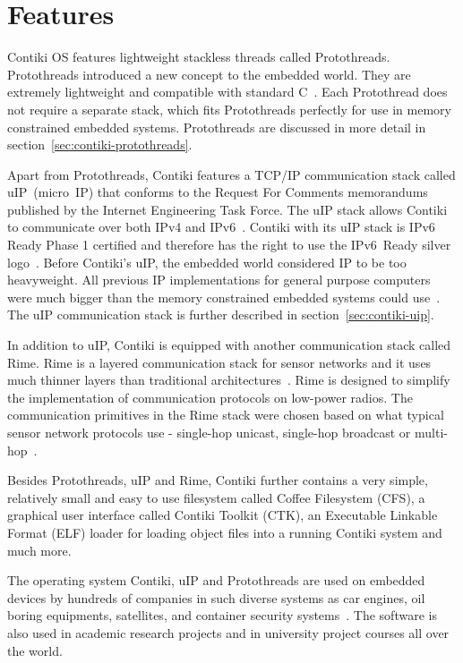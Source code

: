 
\section{Features}
Contiki OS features lightweight stackless threads called Protothreads.
Protothreads introduced a new concept to the embedded world.
They are extremely lightweight and compatible with standard C~\cite{paper-protothreads}.
Each Protothread does not require a separate stack, which fits Protothreads perfectly
for use in memory constrained embedded systems.
Protothreads are discussed in more detail in section~\ref{sec:contiki-protothreads}.

Apart from Protothreads, Contiki features a TCP/IP communication stack called uIP~(micro~IP)
that conforms to the Request For Comments memorandums published by the Internet Engineering Task Force.
The uIP stack allows Contiki to communicate over both IPv4 and IPv6~\cite{contiki-docs}.
Contiki with its uIP stack is IPv6 Ready Phase 1 certified
and therefore has the right to use the IPv6~Ready silver logo~\cite{ipv6ready-db}.
Before Contiki's uIP, the embedded world considered IP to be too heavyweight.
All previous IP implementations for general purpose computers
were much bigger than the memory constrained embedded systems could use~\cite{interconnecting}.
The uIP communication stack is further described in section~\ref{sec:contiki-uip}.

In addition to uIP, Contiki is equipped with another communication stack called Rime.
Rime is a layered communication stack for sensor networks and it uses
much thinner layers than traditional architectures~\cite{paper-rime}.
Rime is designed to simplify the implementation of communication
protocols on low-power radios.
The communication primitives in the Rime stack were chosen
based on what typical sensor network protocols use -
single-hop unicast, single-hop broadcast or multi-hop~\cite{contiki-docs,paper-rime}.

Besides Protothreads, uIP and Rime,
Contiki further contains a very simple, relatively small and easy to use filesystem
called Coffee Filesystem (CFS),
a graphical user interface called Contiki Toolkit (CTK), an
Executable Linkable Format (ELF) loader for loading object files into a running Contiki system
and much more.

The operating system Contiki, uIP and Protothreads are used on embedded devices by hundreds of companies in
such diverse systems as car engines, oil boring equipments, satellites, and container security systems~\cite{thesis-programming}.
The software is also used in academic research
projects and in university project courses all over the world.

